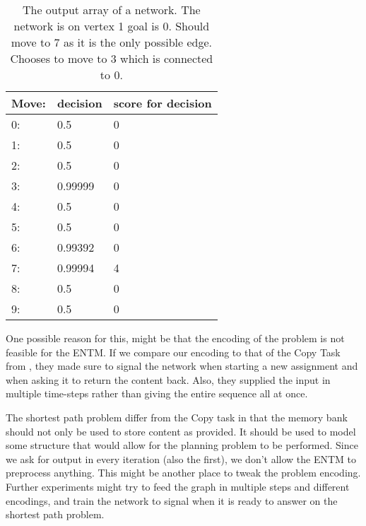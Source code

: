 \begin{table}
	\centering
	\begin{tabular}{|l|l|l|}
		\hline
		Move:&	decision & score for decision\\
		\hline
		0:&	0.5 & 0 \\
		\hline
		1:&	0.5	& 0\\
		\hline
		2:&	0.5	& 0\\
		\hline
		3:&	0.99999 & 0\\
		\hline
		4:&	0.5	& 0\\
		\hline
		5:&	0.5	& 0\\
		\hline
		6:&	0.99392 & 0\\
		\hline
		7:&	0.99994 & 4\\
		\hline
		8:&	0.5 & 0	\\
		\hline
		9:&	0.5 & 0\\
		\hline
	\end{tabular}
	\caption{The output array of a network. The network is on vertex 1 goal is 0. Should move to 7 as it is the only possible edge. Chooses to move to 3 which is connected to 0.}
	\label{table:analysis:1}
\end{table}

\newpar One possible reason for this, might be that the encoding of the problem is not feasible for the ENTM. If we compare our encoding to that of the Copy Task from \cite{greve2016evolving}, they made sure to signal the network when starting a new assignment and when asking it to return the content back. Also, they supplied the input in multiple time-steps rather than giving the entire sequence all at once.

\newpar The shortest path problem differ from the Copy task in that the memory bank should not only be used to store content as provided. It should be used to model some structure that would allow for the planning problem to be performed. Since we ask for output in every iteration (also the first), we don't allow the ENTM to preprocess anything. This might be another place to tweak the problem encoding. Further experiments might try to feed the graph in multiple steps and different encodings, and train the network to signal when it is ready to answer on the shortest path problem.